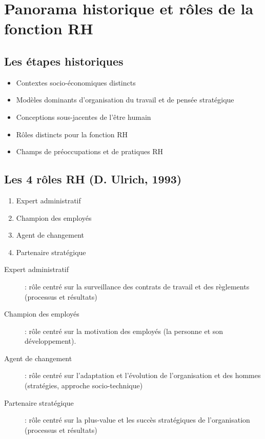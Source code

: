 \documentclass[12pt]{article}
\begin{document}
\section{Panorama historique et rôles de la fonction RH}
	\subsection{Les étapes historiques}
	  \begin{itemize}
	   \item Contextes socio-économiques distincts
	   \item Modèles dominants d'organisation du travail et de pensée stratégique
	   \item Conceptions sous-jacentes de l'être humain
	   \item Rôles distincts pour la fonction RH
	   \item Champs de préoccupations et de pratiques RH
	  \end{itemize}
	  
	  \subsection{Les 4 rôles RH (D. Ulrich, 1993)}
	  
	  \begin{enumerate}
	   \item Expert administratif
	   \item Champion des employés
	   \item Agent de changement
	   \item Partenaire stratégique
	  \end{enumerate}

	  
	  \begin{description}
	   \item[Expert administratif] : rôle centré sur la surveillance des contrats de travail et des règlements (processus et résultats)
	   \item[Champion des employés] : rôle centré sur la motivation des employés (la personne et son développement).
	   \item[Agent de changement] : rôle centré sur l'adaptation et l'évolution de l'organisation et des hommes (stratégies, approche socio-technique)
	   \item[Partenaire stratégique] : rôle centré sur la plus-value et les succès stratégiques de l'organisation (processus et résultats)
	  \end{description}
	  
\end{document}
